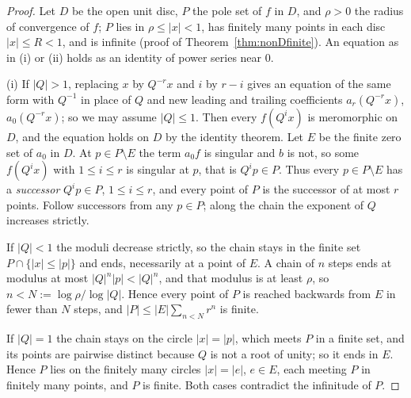 \documentclass[11pt]{article}
\theoremstyle{plain}
\theoremstyle{definition}
\theoremstyle{remark}
\theoremstyle{plain}\newtheorem*{maintheorem}{Main Theorem}
\begin{document}
\begin{proof}
Let $D$ be the open unit disc, $P$ the pole set of $f$ in $D$, and $\rho>0$ the radius of
convergence of $f$; $P$ lies in $\rho\le|x|<1$, has finitely many points in each disc $|x|\le R<1$,
and is infinite (proof of Theorem~\ref{thm:nonDfinite}). An equation as in (i) or (ii) holds as an
identity of power series near $0$.

(i) If $|Q|>1$, replacing $x$ by $Q^{-r}x$ and $i$ by $r-i$ gives an equation of the same form with
$Q^{-1}$ in place of $Q$ and new leading and trailing coefficients $a_r(Q^{-r}x)$, $a_0(Q^{-r}x)$; so
we may assume $|Q|\le1$. Then every $f(Q^ix)$ is meromorphic on $D$, and the equation holds on $D$
by the identity theorem. Let $E$ be the finite zero set of $a_0$ in $D$. At $p\in P\setminus E$ the
term $a_0f$ is singular and $b$ is not, so some $f(Q^ix)$ with $1\le i\le r$ is singular at $p$,
that is $Q^ip\in P$. Thus every $p\in P\setminus E$ has a \emph{successor} $Q^ip\in P$, $1\le i\le
r$, and every point of $P$ is the successor of at most $r$ points. Follow successors from any $p\in
P$; along the chain the exponent of $Q$ increases strictly.

If $|Q|<1$ the moduli decrease strictly, so the chain stays in the finite set $P\cap\{|x|\le|p|\}$
and ends, necessarily at a point of $E$. A chain of $n$ steps ends at modulus at most
$|Q|^n|p|<|Q|^n$, and that modulus is at least $\rho$, so $n<N:=\log\rho/\log|Q|$. Hence every
point of $P$ is reached backwards from $E$ in fewer than $N$ steps, and $|P|\le|E|\sum_{n<N}r^n$ is
finite.

If $|Q|=1$ the chain stays on the circle $|x|=|p|$, which meets $P$ in a finite set, and its points
are pairwise distinct because $Q$ is not a root of unity; so it ends in $E$. Hence $P$ lies on the
finitely many circles $|x|=|e|$, $e\in E$, each meeting $P$ in finitely many points, and $P$ is
finite. Both cases contradict the infinitude of $P$.


\end{proof}
\end{document}
